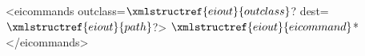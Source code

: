 <eicommands outclass=$\xmlstructref{eiout}{outclass}$? dest=$\xmlstructref{eiout}{path}$?>
  $\xmlstructref{eiout}{eicommand}$*
</eicommands>

